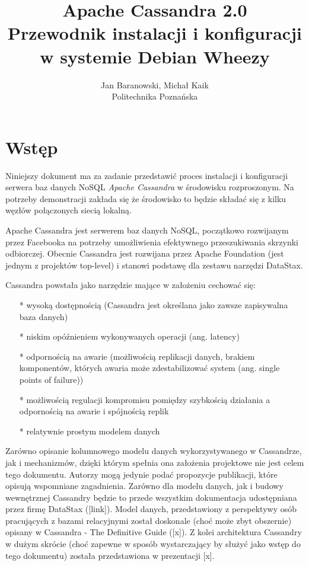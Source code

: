 \documentclass{article}
\begin{document}
\title{Apache Cassandra 2.0\\\vspace{2ex}Przewodnik instalacji i konfiguracji w systemie Debian Wheezy}
\author{Jan Baranowski, Michał Kaik\\Politechnika Poznańska}
\maketitle

\section{Wstęp}

Niniejszy dokument ma za zadanie przedstawić proces instalacji i konfiguracji serwera baz danych NoSQL \emph{Apache Cassandra} w środowisku rozproszonym.
Na potrzeby demonstracji zakłada się że środowisko to będzie składać się z kilku węzłów połączonych siecią lokalną.

Apache Cassandra jest serwerem baz danych NoSQL, początkowo rozwijanym przez Facebooka na potrzeby umożliwienia efektywnego przeszukiwania skrzynki odbiorczej. Obecnie Cassandra jest rozwijana przez Apache Foundation (jest jednym z projektów top-level) i stanowi podstawę dla zestawu narzędzi DataStax. 

Cassandra powstała jako narzędzie mające w założeniu cechować się:
\begin{itemize}
\item[*] wysoką dostępnością (Cassandra jest określana jako zawsze zapisywalna baza danych)
\item[*] niskim opóźnieniem wykonywanych operacji (ang. latency)
\item[*] odpornością na awarie (możliwością replikacji danych, brakiem komponentów, których awaria może zdestabilizować system (ang. single points of failure))
\item[*] możliwością regulacji kompromisu pomiędzy szybkością działania a odpornością na awarie i spójnością replik
\item[*] relatywnie prostym modelem danych
\end{itemize}

Zarówno opisanie kolumnowego modelu danych wykorzystywanego w Cassandrze, jak i mechanizmów, dzięki którym spełnia ona założenia projektowe nie jest celem tego dokumentu. Autorzy mogą jedynie podać propozycje publikacji, które opisują wspomniane zagadnienia. Zarówno dla modelu danych, jak i budowy wewnętrznej Cassandry będzie to przede wszystkim dokumentacja udostępniana przez firmę DataStax ([link]). Model danych, przedstawiony z perspektywy osób pracujących z bazami relacyjnymi został doskonale (choć może zbyt obszernie) opisany w Cassandra - The Definitive Guide ([x]). Z kolei architektura Cassandry w dużym skrócie (choć zapewne w sposób wystarczający by służyć jako wstęp do tego dokumentu) została przedstawiona w prezentacji [x].
\end{document}
